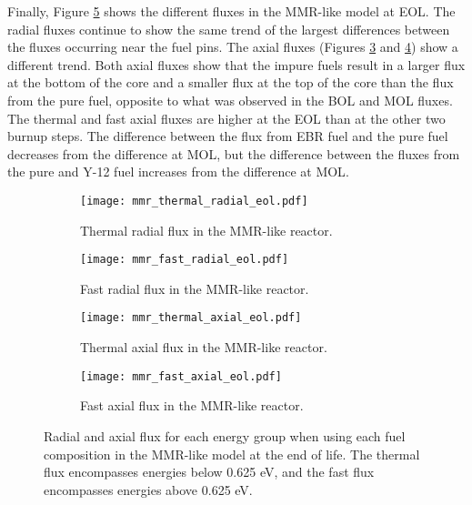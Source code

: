 Finally, Figure \ref{fig:mmr_eol} shows the different fluxes in the 
\gls{MMR}-like model at \gls{EOL}. The radial fluxes continue to show 
the same trend of the largest differences between the fluxes occurring near
the fuel pins. The axial fluxes (Figures \ref{fig:mmr_thermal_axial_eol} and 
\ref{fig:mmr_fast_axial_eol}) show a different trend. Both axial 
fluxes show that the impure fuels result in a larger flux at the 
bottom of the core and a smaller flux at the top of the core than the flux 
from the pure fuel, opposite
to what was observed in the \gls{BOL} and \gls{MOL} fluxes. The thermal 
and fast axial fluxes are higher at the \gls{EOL} than at the other 
two burnup steps. The difference between the flux from \gls{EBR} fuel 
and the pure fuel decreases from the difference at \gls{MOL}, but the 
difference between the fluxes from the pure and Y-12 fuel 
increases from the difference at \gls{MOL}. 
   
\begin{figure}[h!]
        \centering
        \begin{subfigure}[b]{0.48\textwidth}
            \centering
            \texttt{[image: mmr\_thermal\_radial\_eol.pdf]}
            \caption{Thermal radial flux in the \gls{MMR}-like reactor.}
            \label{fig:mmr_thermal_radial_eol}
        \end{subfigure}
        \hfill
        \begin{subfigure}[b]{0.48\textwidth}
            \centering
            \texttt{[image: mmr\_fast\_radial\_eol.pdf]}
            \caption{Fast radial flux in the \gls{MMR}-like reactor.}
            \label{fig:mmr_fast_radial_eol}
        \end{subfigure}
        \hfill
            
        \begin{subfigure}[b]{0.48\textwidth}
            \centering
            \texttt{[image: mmr\_thermal\_axial\_eol.pdf]}
            \caption{Thermal axial flux in the \gls{MMR}-like reactor. }
            \label{fig:mmr_thermal_axial_eol}
        \end{subfigure}
        \hfill
        \begin{subfigure}[b]{0.48\textwidth}
            \centering
            \texttt{[image: mmr\_fast\_axial\_eol.pdf]}
            \caption{Fast axial flux in the \gls{MMR}-like reactor.}
            \label{fig:mmr_fast_axial_eol}
        \end{subfigure}
        \hfill
        \caption{Radial and axial flux for each energy group when using 
        each fuel composition in the \gls{MMR}-like model at the end 
        of life. The thermal flux encompasses energies below 
        0.625 eV, and the 
        fast flux encompasses energies above 0.625 eV.}
        \label{fig:mmr_eol}
   \end{figure}


